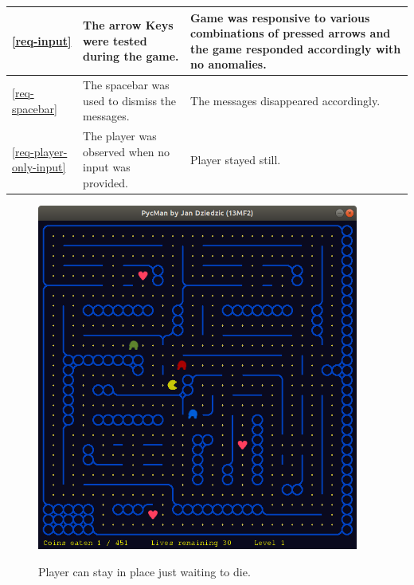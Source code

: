 \documentclass[11pt,a4paper,notitlepage]{report}
\newenvironment{img}{
	\begin{center}
		\begin{figure}[H]
			\begin{center}
			
}{
	\end{center}
		\end{figure}
			\end{center}
}
\begin{document}
\begin{center}
\begin{longtable}{ | p{2cm} | p{5cm} | p{4cm} |}
					\ref{req-input}&The arrow Keys were tested during the game.&Game was responsive to various combinations of pressed arrows and the game responded accordingly with no anomalies.\\ \hline
					\ref{req-spacebar}&The spacebar was used to dismiss the messages.&The messages disappeared accordingly.\\ \hline
					\ref{req-player-only-input}&The player was observed when no input was provided.&Player stayed still.\\ \hline
				\end{longtable}
				\begin{img}
					\includegraphics[width=300pt]{images/player-not-moving.png}\\
					\caption{Player can stay in place just waiting to die.}
				\end{img}
			\end{center}			
			
\end{document}
